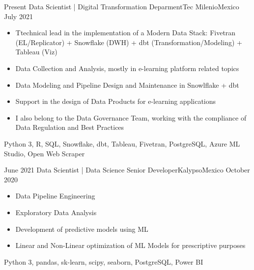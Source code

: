 %
%
%

\begin{experiences}
  \experience
    {Present}   {Data Scientist | Digital Transformation Deparment}{Tec Milenio}{Mexico}
    {July 2021} {
                      \begin{itemize}
                        \item Ttechnical lead in the implementation of a Modern Data Stack: 
                        Fivetran (EL/Replicator) + Snowflake (DWH) + dbt (Transformation/Modeling) + Tableau (Viz)
                        \item Data Collection and Analysis, mostly in e-learning platform related topics
                        \item Data Modeling and Pipeline Design and Maintenance in Snowlflake + dbt
                        \item Support in the design of Data Products for e-learning applications
                        \item I also belong to the Data Governance Team, working with the compliance of Data Regulation and Best Practices
                      \end{itemize}
                    }
                    {Python 3, R, SQL, Snowflake, dbt, Tableau, Fivetran, PostgreSQL, Azure ML Studio, Open Web Scraper}
  \emptySeparator
  
  \experience
    {June 2021} {Data Scientist | Data Science Senior Developer}{Kalypso}{Mexico}
    {October 2020}    {
                      \begin{itemize}
                        \item Data Pipeline Engineering
                        \item Exploratory Data Analysis
                        \item Development of predictive models using ML
                        \item Linear and Non-Linear optimization of ML Models for prescriptive purposes
                      \end{itemize}
                    }
                    {Python 3, pandas, sk-learn, scipy, seaborn, PostgreSQL, Power BI}
  \emptySeparator
  

\end{experiences}
